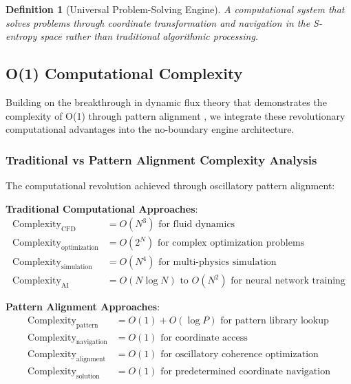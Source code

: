 \documentclass[11pt,a4paper]{article}
\newtheorem{definition}[theorem]{Definition}
\theoremstyle{remark}
\begin{document}
\begin{definition}[Universal Problem-Solving Engine]
A computational system that solves problems through coordinate transformation and navigation in the S-entropy space rather than traditional algorithmic processing.
\end{definition}

\subsection{O(1) Computational Complexity}

Building on the breakthrough in dynamic flux theory that demonstrates the complexity of O(1) through pattern alignment \cite{sachikonye2024flux}, we integrate these revolutionary computational advantages into the no-boundary engine architecture.

\subsubsection{Traditional vs Pattern Alignment Complexity Analysis}

The computational revolution achieved through oscillatory pattern alignment:

\textbf{Traditional Computational Approaches}:
\begin{align}
\text{Complexity}_{\text{CFD}} &= O(N^3) \text{ for fluid dynamics} \\
\text{Complexity}_{\text{optimization}} &= O(2^N) \text{ for complex optimization problems} \\
\text{Complexity}_{\text{simulation}} &= O(N^4) \text{ for multi-physics simulation} \\
\text{Complexity}_{\text{AI}} &= O(N \log N) \text{ to } O(N^2) \text{ for neural network training}
\end{align}

\textbf{Pattern Alignment Approaches}:
\begin{align}
\text{Complexity}_{\text{pattern}} &= O(1) + O(\log P) \text{ for pattern library lookup} \\
\text{Complexity}_{\text{navigation}} &= O(1) \text{ for coordinate access} \\
\text{Complexity}_{\text{alignment}} &= O(1) \text{ for oscillatory coherence optimization} \\
\text{Complexity}_{\text{solution}} &= O(1) \text{ for predetermined coordinate navigation}
\end{align}
\end{document}
